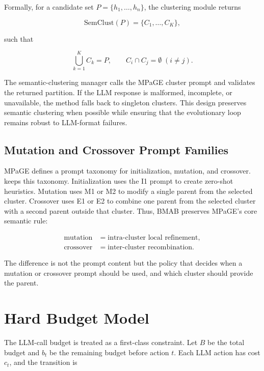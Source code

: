 \documentclass[../main.tex]{subfiles}
\begin{document}
Formally, for a candidate set $P=\{h_1,\ldots,h_n\}$, the clustering module returns

\begin{equation}
  \mathrm{SemClust}(P)=\{C_1,\ldots,C_K\},
\end{equation}

such that

\begin{equation}
  \bigcup_{k=1}^{K} C_k=P, \qquad C_i \cap C_j = \emptyset \; (i \ne j).
\end{equation}

The semantic-clustering manager calls the MPaGE cluster prompt and validates the returned partition. If the LLM response is malformed, incomplete, or unavailable, the method falls back to singleton clusters. This design preserves semantic clustering when possible while ensuring that the evolutionary loop remains robust to LLM-format failures.

\subsection{Mutation and Crossover Prompt Families}

MPaGE defines a prompt taxonomy for initialization, mutation, and crossover. \bmab{} keeps this taxonomy. Initialization uses the I1 prompt to create zero-shot heuristics. Mutation uses M1 or M2 to modify a single parent from the selected cluster. Crossover uses E1 or E2 to combine one parent from the selected cluster with a second parent outside that cluster. Thus, BMAB preserves MPaGE's core semantic rule:

\begin{equation}
  \begin{aligned}
    \text{mutation} &= \text{intra-cluster local refinement},\\
    \text{crossover} &= \text{inter-cluster recombination}.
  \end{aligned}
\end{equation}

The difference is not the prompt content but the policy that decides when a mutation or crossover prompt should be used, and which cluster should provide the parent.

\section{Hard Budget Model}

The LLM-call budget is treated as a first-class constraint. Let $B$ be the total budget and $b_t$ be the remaining budget before action $t$. Each LLM action has cost $c_t$, and the transition is
\end{document}
